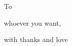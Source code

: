 %
%
%

\cleardoublepage

\vspace*{5em}
\hfill
\begin{center}
    \large
    To\par
    \vspace{1.5em}
    whoever you want,\par
    \vspace{1.5em}
    with thanks and love
\end{center}
\vspace{\fill}
\thispagestyle{empty}

